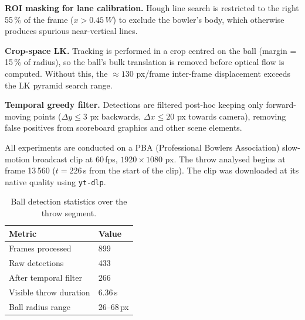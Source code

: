 \documentclass[11pt,twoside]{article}
\begin{document}
\textbf{ROI masking for lane calibration.}
Hough line search is restricted to the right 55\,\% of the frame ($x > 0.45\,W$) to exclude the bowler's body, which otherwise produces spurious near-vertical lines.

\textbf{Crop-space LK.}
Tracking is performed in a crop centred on the ball (margin = 15\,\% of radius), so the ball's bulk translation is removed before optical flow is computed.
Without this, the $\approx 130$ px/frame inter-frame displacement exceeds the LK pyramid search range.

\textbf{Temporal greedy filter.}
Detections are filtered post-hoc keeping only forward-moving points ($\Delta y \leq 3$ px backwards, $\Delta x \leq 20$ px towards camera), removing false positives from scoreboard graphics and other scene elements.

{}
\label{sec:results}

{}

All experiments are conducted on a PBA (Professional Bowlers Association) slow-motion broadcast clip at 60\,fps, $1920 \times 1080$ px.
The throw analysed begins at frame 13\,560 ($t = 226$\,s from the start of the clip).
The clip was downloaded at its native quality using \texttt{yt-dlp}.

{}

\begin{table}[H]
\centering
\caption{Ball detection statistics over the throw segment.}
\label{tab:detection}
\begin{tabu} to \textwidth { X[0.5,l] X[0.5,r] }
\toprule
\textbf{Metric} & \textbf{Value} \\
\midrule
Frames processed       & 899 \\
Raw detections         & 433 \\
After temporal filter  & 266 \\
Visible throw duration & 6.36\,s \\
Ball radius range      & 26--68\,px \\
\bottomrule
\end{tabu}
\end{table}
\end{document}
